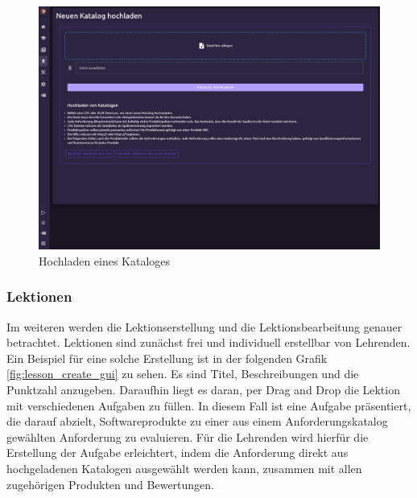 \begin{figure}[H]
    \centering
    \includegraphics[width=1.0\textwidth]{assets/screenshots/finale_gui/Katalog_Upload.png}
    \caption{Hochladen eines Kataloges}
    \label{fig:catalog_upload_gui}
\end{figure}

\subsubsection{Lektionen}

Im weiteren werden die Lektionserstellung und die Lektionsbearbeitung genauer betrachtet. Lektionen sind zunächst frei und individuell erstellbar von Lehrenden. Ein Beispiel für eine solche Erstellung ist in der folgenden Grafik \ref{fig:lesson_create_gui} zu sehen. Es sind Titel, Beschreibungen und die Punktzahl anzugeben. Daraufhin liegt es daran, per Drag and Drop die Lektion mit verschiedenen Aufgaben zu füllen. In diesem Fall ist eine Aufgabe präsentiert, die darauf abzielt, Softwareprodukte zu einer aus einem Anforderungskatalog gewählten Anforderung zu evaluieren. 
Für die Lehrenden wird hierfür die Erstellung der Aufgabe erleichtert, indem die Anforderung direkt aus hochgeladenen Katalogen ausgewählt werden kann, zusammen mit allen zugehörigen Produkten und Bewertungen. 

